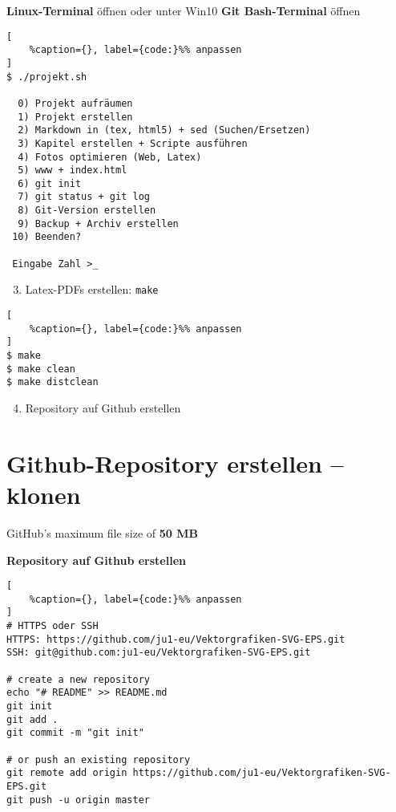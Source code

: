 \textbf{Linux-Terminal} öffnen oder unter Win10 \textbf{Git
Bash-Terminal} öffnen

\lstset{language=C}%
\begin{lstlisting}[
	%caption={}, label={code:}%% anpassen
]
$ ./projekt.sh

  0) Projekt aufräumen
  1) Projekt erstellen
  2) Markdown in (tex, html5) + sed (Suchen/Ersetzen)
  3) Kapitel erstellen + Scripte ausführen
  4) Fotos optimieren (Web, Latex)
  5) www + index.html
  6) git init
  7) git status + git log
  8) Git-Version erstellen
  9) Backup + Archiv erstellen
 10) Beenden?

 Eingabe Zahl >_
\end{lstlisting}

\begin{enumerate}
\setcounter{enumi}{2}
\item
  Latex-PDFs erstellen: \verb|make|
\end{enumerate}

\lstset{language=C}%
\begin{lstlisting}[
	%caption={}, label={code:}%% anpassen
]
$ make
$ make clean
$ make distclean
\end{lstlisting}

\begin{enumerate}
\setcounter{enumi}{3}
\item
  Repository auf Github erstellen
\end{enumerate}

\section{Github-Repository erstellen --
klonen}\label{github-repository-erstellen-klonen}

GitHub's maximum file size of \textbf{50 MB}

\textbf{Repository auf Github erstellen}

\lstset{language=C}%
\begin{lstlisting}[
	%caption={}, label={code:}%% anpassen
]
# HTTPS oder SSH
HTTPS: https://github.com/ju1-eu/Vektorgrafiken-SVG-EPS.git
SSH: git@github.com:ju1-eu/Vektorgrafiken-SVG-EPS.git

# create a new repository 
echo "# README" >> README.md
git init
git add .
git commit -m "git init"
                
# or push an existing repository 
git remote add origin https://github.com/ju1-eu/Vektorgrafiken-SVG-EPS.git
git push -u origin master
\end{lstlisting}

